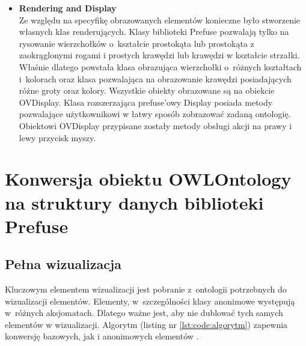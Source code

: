 \begin{itemize}
\item{\bf Rendering and Display}\\
Ze względu na specyfikę obrazowanych elementów konieczne było stworzenie własnych klas renderujących. Klasy biblioteki Prefuse pozwalają tylko na rysowanie
wierzchołków o~kształcie prostokąta lub prostokąta z zaokrąglonymi rogami i prostych krawędzi lub krawędzi w kształcie strzałki. Właśnie dlatego powstała klasa obrazująca 
wierzchołki o~różnych kształtach i~kolorach oraz klasa pozwalająca na obrazowanie krawędzi posiadających różne groty oraz kolory. Wszystkie obiekty obrazowane są 
na obiekcie OVDisplay. Klasa rozszerzająca prefuse'owy Display posiada metody pozwalające użytkownikowi w łatwy sposób zobrazować zadaną ontologię. Obiektowi 
OVDisplay przypisane zostały metody obsługi akcji na prawy i lewy przycisk myszy. 

\end{itemize}
\section{Konwersja obiektu OWLOntology na struktury danych biblioteki Prefuse}
\subsection{Pełna wizualizacja}
\label{konwersja}
Kluczowym elementem wizualizacji jest pobranie z~ontologii potrzebnych do wizualizacji elementów. Elementy, w~szczególności klasy anonimowe występują w~różnych
 aksjomatach. Dlatego ważne jest, aby nie dublować tych samych elementów w wizualizacji. Algorytm (listing nr \ref{lst:code:algorytm}) zapewnia konwersję bazowych,
jak i anonimowych elementów \cite{nasz}. 




